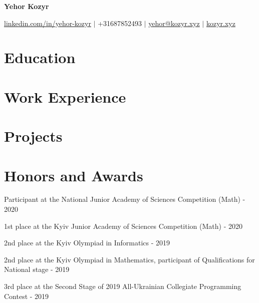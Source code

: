 \documentclass[a4paper,21pt]{article}
\begin{document}
\begin{center} \textbf{\LARGE{Yehor Kozyr}} \end{center}
\vspace{-12pt}
\begin{center}
\href{https://www.linkedin.com/in/yehor-kozyr/}{linkedin.com/in/yehor-kozyr} $\vert$ +31687852493 $\vert$ \href{mailto:yehor@kozyr.xyz}{yehor@kozyr.xyz} $\vert$ \href{https://kozyr.xyz}{kozyr.xyz} \end{center}


\section{Education}
  \resumeSubHeadingListStart
    
\resumeSubHeadingListEnd

\vspace{-8pt}
\section{Work Experience}
  \resumeSubHeadingListStart
    
    \vspace{-8pt}
    
  \resumeSubHeadingListEnd
\vspace{-6pt}
\section{Projects}
\resumeSubHeadingListStart
  
  \vspace{-8pt}
  
\resumeSubHeadingListEnd

\vspace{-5pt}
\section{Honors and Awards}
\begin{description}[font=$\bullet$]
\item {Participant at the National Junior Academy of Sciences Competition (Math) - 2020}
\vspace{-5pt}
\item {1st place at the Kyiv Junior Academy of Sciences Competition (Math) - 2020}
\vspace{-5pt}
\item {2nd place at the Kyiv Olympiad in Informatics - 2019}
\vspace{-5pt}
\item {2nd place at the Kyiv Olympiad in Mathematics, participant of Qualifications for National stage - 2019}
\vspace{-5pt}
\item {3rd place at the Second Stage of 2019 All-Ukrainian Collegiate Programming Contest - 2019}
\end{description}
\end{document}

